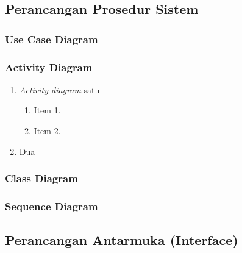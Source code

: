 \subsection{Perancangan Prosedur Sistem}

\subsubsection{Use Case Diagram}

\subsubsection{Activity Diagram}
\begin{enumerate}[nolistsep,leftmargin=0.5cm]
\item \textit{Activity diagram} satu

\begin{enumerate}[label=\alph*.]
	\item Item 1.
	\item Item 2.
	\end{enumerate}
\item Dua
\end{enumerate}

\subsubsection{Class Diagram}

\subsubsection{Sequence Diagram}

\subsection{Perancangan Antarmuka (Interface)}

\newpage